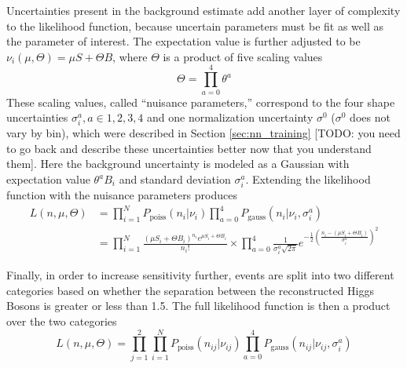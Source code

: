     Uncertainties present in the background estimate add another layer of complexity to the likelihood function,
        because uncertain parameters must be fit as well as the parameter of interest.
    The expectation value is further adjusted to be $\nu_i(\mu, \Theta) = \mu S + \Theta B$,
        where $\Theta$ is a product of five scaling values 
    \begin{equation}
        \Theta = \prod \limits_{a=0}^{4}  \theta^a
    \end{equation}
    These scaling values, called ``nuisance parameters,''
        correspond to the four shape uncertainties $\sigma_i^a, a\in{1,2,3,4}$
        and one normalization uncertainty $\sigma^0$ ($\sigma^0$ does not vary by bin),
        which were described in Section \ref{sec:nn_training}
        [TODO: you need to go back and describe these uncertainties better now that you understand them].
    Here the background uncertainty is modeled as a Gaussian with expectation value $\theta^a B_i$ and standard deviation $\sigma_i^a$.
    Extending the likelihood function with the nuisance parameters produces
    \begin{equation} \begin{split}
        L(n,\mu,\Theta) &= \prod \limits_{i=1}^{N} P_{\textrm{poiss}}(n_i | \nu_i) 
             \prod \limits_{a=0}^{4} P_{\textrm{gauss}}(n_i | \nu_i, \sigma_i^a) 
        \\&= \prod \limits_{i=1}^{N} \frac{ (\mu S_i + \Theta B_i)^{n_i} e^{\mu S_i + \Theta B_i} }{n_i!} \times
            \prod \limits_{a=0}^4 \frac{1}{\sigma_i^a \sqrt{2\pi}} e^{
                -\frac{1}{2}\left(\frac{n_i- (\mu S_i + \Theta B_i)}{\sigma_i^a}\right)^2
            }
    \end{split} \end{equation}

    Finally, in order to increase sensitivity further, events are split into two different categories
        based on whether the \deta separation between the reconstructed Higgs Bosons is greater or less than 1.5.
    The full likelihood function is then a product over the two categories
    \begin{equation}
        L(n,\mu,\Theta) = \prod \limits_{j=1}^{2}
             \prod \limits_{i=1}^{N} P_{\textrm{poiss}}(n_{ij} | \nu_{ij}) 
             \prod \limits_{a=0}^{4} P_{\textrm{gauss}}(n_{ij} | \nu_{ij}, \sigma_{i}^a) 
    \end{equation}

